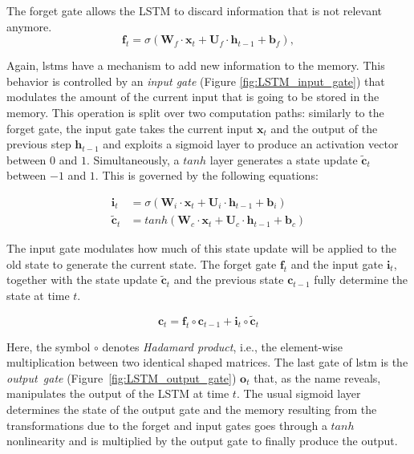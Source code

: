 The forget gate allows the LSTM to discard information that is not relevant anymore. 
\begin{equation}\label{eq:LSTM_forget_gate}
\mathbf{f}_t = \sigma\left(\mathbf{W}_f \cdot \mathbf{x}_t + \mathbf{U}_f \cdot \mathbf{h}_{t-1} + \mathbf{b}_f \right),
\end{equation}

Again, \gls{lstm}s have a mechanism to add new information to the memory. This behavior is controlled by an \emph{input gate} (Figure \ref{fig:LSTM_input_gate}) that modulates the amount of the current input that is going to be stored in the memory. This operation is split over two computation paths: similarly to the forget gate, the input gate takes the current input $\mathbf{x}_t$ and the output of the previous step $\mathbf{h}_{t-1}$ and exploits a sigmoid layer to produce an activation vector between $0$ and $1$. Simultaneously, a $tanh$ layer generates a state update $\mathbf{\tilde c}_t$ between $-1$ and $1$. This is governed by the following equations:

\begin{equation}\label{eq:LSTM_input_gate}
\begin{split}
\mathbf{i}_t &= \sigma\left(\mathbf{W}_i \cdot \mathbf{x}_t + \mathbf{U}_i \cdot \mathbf{h}_{t-1} + \mathbf{b}_i \right)\\
\mathbf{\tilde c}_t &= tanh \left(\mathbf{W}_c \cdot \mathbf{x}_t + \mathbf{U}_c \cdot \mathbf{h}_{t-1} + \mathbf{b}_c \right)
\end{split}
\end{equation}

The input gate modulates how much of this state update will be applied to the old state to generate the current state. The forget gate $\mathbf{f}_t$ and the input gate $\mathbf{i}_t$, together with the state update $\mathbf{\tilde c}_t$ and the previous state $\mathbf{c}_{t-1}$ fully determine the state at time $t$. 

\begin{equation}\label{eq:LSTM_state_update}
\mathbf{c}_t = \mathbf{f}_t \circ \mathbf{c}_{t-1} + \mathbf{i}_t \circ \mathbf{\tilde c}_t
\end{equation}

Here, the symbol $\circ$ denotes \textit{Hadamard product}, i.e., the element-wise multiplication between two identical shaped matrices. The last gate of \gls{lstm} is the \emph{output~gate} (Figure~\ref{fig:LSTM_output_gate}) $\mathbf{o}_t$ that, as the name reveals, manipulates the output of the LSTM at time $t$. The usual sigmoid layer determines the state of the output gate and the memory resulting from the transformations due to the forget and input gates goes through a $tanh$ nonlinearity and is multiplied by the output gate to finally produce the output.

